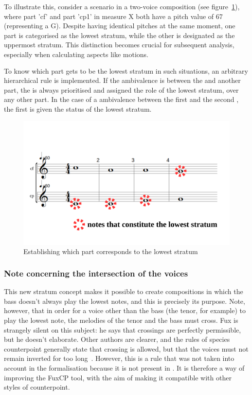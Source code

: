 To illustrate this, consider a scenario in a two-voice composition (see figure~\ref{fig:one-voice-max-can-be-a}), where part 'cf' and part 'cp1' in measure X both have a pitch value of 67 (representing a G). Despite having identical pitches at the same moment, one part is categorised as the lowest stratum, while the other is designated as the uppermost stratum. This distinction becomes crucial for subsequent analysis, especially when calculating aspects like motions.

To know which part gets to be the lowest stratum in such situations, an arbitrary hierarchical rule is implemented. If the ambivalence is between the \cfs and another part, the \cfs is always prioritised and assigned the role of the lowest stratum, over any other part. In the case of a ambivalence between the first \cps and the second \cp, the first \cps is given the status of the lowest stratum. 

\begin{figure}[h]
    \centering
    \includegraphics[width=.5\textwidth]{Images/one-voice-max-can-be-a.png}
    \caption{Establishing which part corresponds to the lowest stratum}
    \label{fig:one-voice-max-can-be-a}
  \end{figure}

\subsubsection{Note concerning the intersection of the voices}
This new stratum concept makes it possible to create compositions in which the bass doesn't always play the lowest notes, and this is precisely its purpose. Note, however, that in order for a voice other than the bass (the tenor, for example) to play the lowest note, the melodies of the tenor and the bass must cross. Fux is strangely silent on this subject: he says that crossings are perfectly permissible, but he doesn't elaborate. Other authors are clearer, and the rules of species counterpoint generally state that crossing is allowed, but that the voices must not remain inverted for too long~\cite[p.28]{Bitsch}. However, this is a rule that was not taken into account in the formalisation because it is not present in \gap. It is therefore a way of improving the FuxCP tool, with the aim of making it compatible with other styles of counterpoint.

